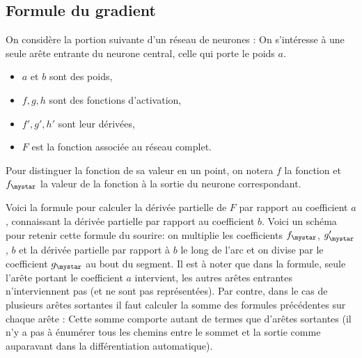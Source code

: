 \documentclass[11pt,class=report,crop=false]{standalone}
\begin{document}
\subsection{Formule du gradient}

On considère la portion suivante d'un réseau de neurones :
On s'intéresse à une seule arête entrante du neurone central, celle qui porte le poids $a$.
\begin{itemize}
  \item $a$ et $b$ sont des poids,
  \item $f, g, h$ sont des fonctions d'activation,
  \item $f', g', h'$ sont leur dérivées,
  \item $F$ est la fonction associée au réseau complet.
\end{itemize}

Pour distinguer la fonction de sa valeur en un point, on notera $f$ la fonction et $f_\mystar$ la valeur de la fonction à la sortie du neurone correspondant.

Voici la formule pour calculer la dérivée partielle de $F$ par rapport au coefficient $a$, connaissant la dérivée partielle par rapport au coefficient $b$.
Voici un schéma pour retenir cette \og{}formule du sourire\fg{}:
on multiplie les coefficients $f_\mystar$, $g'_\mystar$, $b$ et la dérivée partielle par rapport à $b$ le long de l'arc et on divise par le coefficient $g_\mystar$ au bout du segment.
Il est à noter que dans la formule, seule l'arête portant le coefficient $a$ intervient, les autres arêtes entrantes n'interviennent pas (et ne sont pas représentées). 
Par contre, dans le cas de plusieurs arêtes sortantes il faut calculer la somme 
des formules précédentes sur chaque arête :
Cette somme comporte autant de termes que d'arêtes sortantes (il n'y a pas à énumérer tous les chemins entre le sommet et la sortie comme auparavant dans la différentiation automatique).

\bigskip
\end{document}
